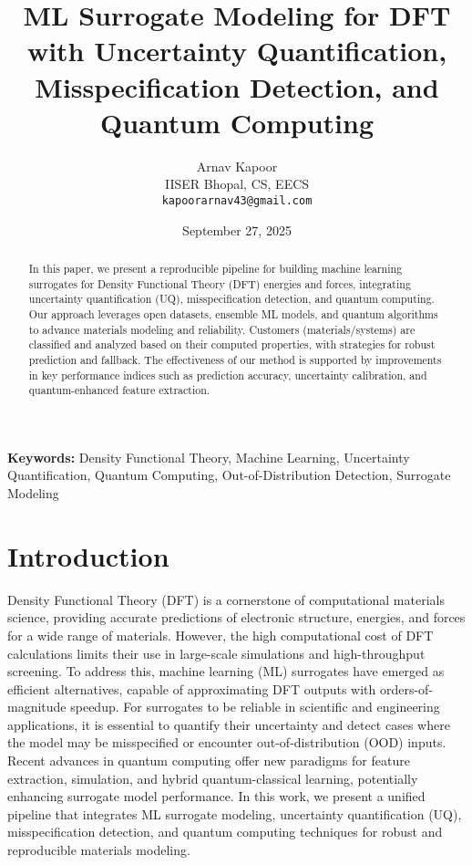 \documentclass[12pt]{article}
\title{ML Surrogate Modeling for DFT with Uncertainty Quantification, Misspecification Detection, and Quantum Computing}
\author{Arnav Kapoor \\ IISER Bhopal, CS, EECS \\ \texttt{kapoorarnav43@gmail.com}}
\date{September 27, 2025}
\begin{document}
\maketitle

\begin{abstract}
In this paper, we present a reproducible pipeline for building machine learning surrogates for Density Functional Theory (DFT) energies and forces, integrating uncertainty quantification (UQ), misspecification detection, and quantum computing. Our approach leverages open datasets, ensemble ML models, and quantum algorithms to advance materials modeling and reliability. Customers (materials/systems) are classified and analyzed based on their computed properties, with strategies for robust prediction and fallback. The effectiveness of our method is supported by improvements in key performance indices such as prediction accuracy, uncertainty calibration, and quantum-enhanced feature extraction.
\end{abstract}

\textbf{Keywords:} Density Functional Theory, Machine Learning, Uncertainty Quantification, Quantum Computing, Out-of-Distribution Detection, Surrogate Modeling

\section{Introduction}
Density Functional Theory (DFT) is a cornerstone of computational materials science, providing accurate predictions of electronic structure, energies, and forces for a wide range of materials. However, the high computational cost of DFT calculations limits their use in large-scale simulations and high-throughput screening. To address this, machine learning (ML) surrogates have emerged as efficient alternatives, capable of approximating DFT outputs with orders-of-magnitude speedup. For surrogates to be reliable in scientific and engineering applications, it is essential to quantify their uncertainty and detect cases where the model may be misspecified or encounter out-of-distribution (OOD) inputs. Recent advances in quantum computing offer new paradigms for feature extraction, simulation, and hybrid quantum-classical learning, potentially enhancing surrogate model performance. In this work, we present a unified pipeline that integrates ML surrogate modeling, uncertainty quantification (UQ), misspecification detection, and quantum computing techniques for robust and reproducible materials modeling.
\end{document}
